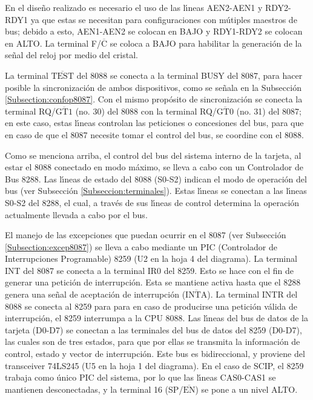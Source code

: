 En el dise\~no realizado es necesario el uso de las l\'{\i}neas AEN2-AEN1 y RDY2-RDY1 ya que %
estas se necesitan para configuraciones con m\'utiples maestros de bus; debido a esto, AEN1-AEN2 %
se colocan en BAJO y RDY1-RDY2 se colocan en ALTO. La terminal F/$\overline{\mbox{C}}$ se %
coloca a BAJO para habilitar la generaci\'on de la se\~nal del reloj por medio del cristal.

La terminal $\overline{\mbox{TEST}}$ del 8088 se conecta a la terminal BUSY del 8087, para %
hacer posible la sincronizaci\'on de ambos dispositivos, como se se\~nala en la Subsecci\'on %
\ref{Subsection:confop8087}. Con el mismo prop\'osito de sincronizaci\'on se conecta la %
terminal RQ/$\overline{\mbox{GT1}}$ (no. 30) del 8088 con la terminal %
RQ/$\overline{\mbox{GT0}}$ (no. 31) del 8087; en este caso, estas l\'{\i}neas controlan %
las peticiones o concesiones del bus, para que en caso de que el 8087 necesite tomar el control %
del bus, se coordine con el 8088.

Como se menciona arriba, el control del bus del sistema interno de la tarjeta, al estar el 8088 %
conectado en modo m\'aximo, se lleva a cabo con un Controlador de Bus 8288. Las l\'{\i}neas de %
estado del 8088 (S0-S2) indican el modo de operaci\'on del bus (ver Subsecci\'on %
\ref{Subseccion:terminales}). Estas l\'{\i}neas se conectan a las l\'{\i}neas S0-S2 del %
8288, el cual, a trav\'es de sus l\'{\i}neas de control determina la operaci\'on actualmente %
llevada a cabo por el bus.

El manejo de las excepciones que puedan ocurrir en el 8087 (ver Subsecci\'on %
\ref{Subsection:excep8087}) se lleva a cabo mediante un PIC (Controlador de Interrupciones %
Programable) 8259 (U2 en la hoja 4 del diagrama). La terminal INT del 8087 se conecta a la %
terminal IR0 del 8259. Esto se hace con el fin de generar una petici\'on de interrupci\'on. %
Esta se mantiene activa hasta que el 8288 genera una se\~nal de aceptaci\'on de interrupci\'on %
($\overline{\mbox{INTA}}$). La terminal INTR del 8088 se conecta al 8259 para para en caso %
de producirse una petici\'on v\'alida de interrupci\'on, el 8259 interrumpa a la CPU 8088. Las %
l\'{\i}neas del bus de datos de la tarjeta (D0-D7) se conectan a las terminales del bus de %
datos del 8259 (D0-D7), las cuales son de tres estados, para que por ellas se transmita la %
informaci\'on de control, estado y vector de interrupci\'on. Este bus es bidireccional, y %
proviene del transceiver 74LS245 (U5 en la hoja 1 del diagrama). En el caso de SCIP, el 8259 %
trabaja como \'unico PIC del sistema, por lo que las l\'{\i}neas CAS0-CAS1 se mantienen %
desconectadas, y la terminal 16 (SP/$\overline{\mbox{EN}}$) se pone a un nivel ALTO. 

